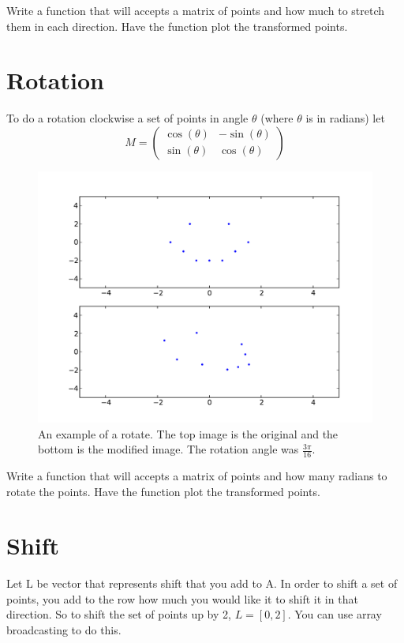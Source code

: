 \begin{problem}
Write a function that will accepts a matrix of points and how much to stretch them in each direction. Have the function plot the transformed points.
\end{problem}

\section*{Rotation}
To do a rotation clockwise a set of points in angle $\theta$ (where $\theta$ is in radians) let
\[
M = \begin{pmatrix}
\cos(\theta) & -\sin(\theta) \\
\sin(\theta) & \cos(\theta) 
\end{pmatrix}
\]

\begin{figure}[H]
\includegraphics[scale = .5]{rotate.pdf}
\caption{An example of a rotate. The top image is the original and the bottom is the modified image. The rotation angle was $\frac{3\pi}{16}$.}
\end{figure}

\begin{problem}
Write a function that will accepts a matrix of points and how many radians to rotate the points. Have the function plot the transformed points.
\end{problem}

\section*{Shift}
Let L be vector that represents shift that you add to A. In order to shift a set of points, you add to the row how much you would like it to shift it in that direction. So to shift the set of points up by 2, $L=[0,2]$. You can use array broadcasting to do this.

